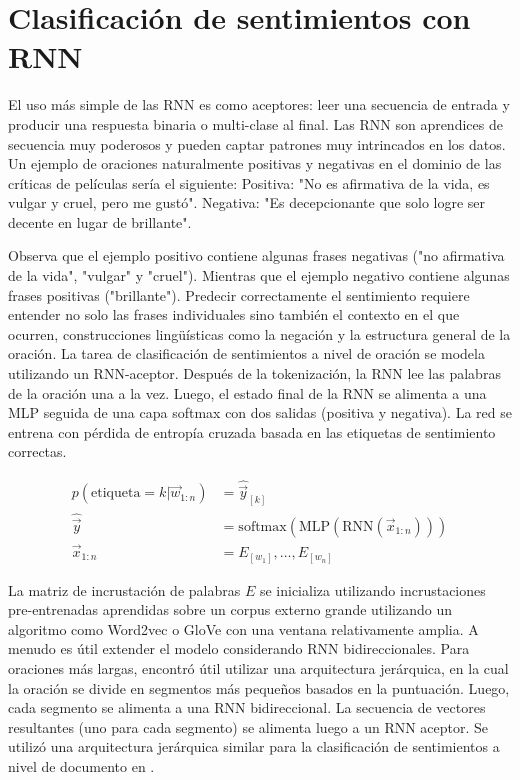 \section{Clasificación de sentimientos con RNN}
El uso más simple de las RNN es como aceptores: leer una secuencia de entrada y producir una respuesta binaria o multi-clase al final. Las RNN son aprendices de secuencia muy poderosos y pueden captar patrones muy intrincados en los datos. Un ejemplo de oraciones naturalmente positivas y negativas en el dominio de las críticas de películas sería el siguiente: Positiva: "No es afirmativa de la vida, es vulgar y cruel, pero me gustó". Negativa: "Es decepcionante que solo logre ser decente en lugar de brillante".

Observa que el ejemplo positivo contiene algunas frases negativas ("no afirmativa de la vida", "vulgar" y "cruel"). Mientras que el ejemplo negativo contiene algunas frases positivas ("brillante"). Predecir correctamente el sentimiento requiere entender no solo las frases individuales sino también el contexto en el que ocurren, construcciones lingüísticas como la negación y la estructura general de la oración. La tarea de clasificación de sentimientos a nivel de oración se modela utilizando un RNN-aceptor. Después de la tokenización, la RNN lee las palabras de la oración una a la vez. Luego, el estado final de la RNN se alimenta a una MLP seguida de una capa softmax con dos salidas (positiva y negativa). La red se entrena con pérdida de entropía cruzada basada en las etiquetas de sentimiento correctas.

\begin{equation}
\begin{split}
p(\text{etiqueta}=k | \vec{w}_{1:n}) & = \hat{\vec{y}}_{[k]} \\
\hat{\vec{y}} & = \text{softmax}(\text{MLP}(\text{RNN}(\vec{x}_{1:n}))) \\
\vec{x}_{1:n} & = E_{[w_{1}]}, \dots, E_{[w_{n}]}
\end{split}
\end{equation}

La matriz de incrustación de palabras $E$ se inicializa utilizando incrustaciones pre-entrenadas aprendidas sobre un corpus externo grande utilizando un algoritmo como Word2vec o GloVe con una ventana relativamente amplia. A menudo es útil extender el modelo considerando RNN bidireccionales. Para oraciones más largas, \cite{li2015tree} encontró útil utilizar una arquitectura jerárquica, en la cual la oración se divide en segmentos más pequeños basados en la puntuación. Luego, cada segmento se alimenta a una RNN bidireccional. La secuencia de vectores resultantes (uno para cada segmento) se alimenta luego a un RNN aceptor. Se utilizó una arquitectura jerárquica similar para la clasificación de sentimientos a nivel de documento en \cite{tang2015document}.

